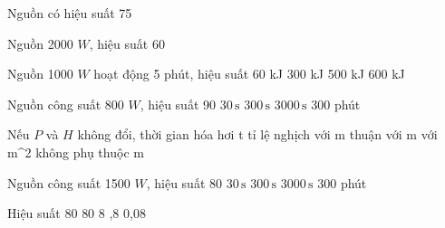 \begin{bt}
Nguồn có hiệu suất 75%
\end{bt}

\begin{ex}
Nguồn 2000 $W$, hiệu suất 60%
\end{ex}

\begin{ex}
Nguồn 1000 $W$ hoạt động 5 phút, hiệu suất 60%
\choice
{ kJ}
{300 kJ}
{500 kJ}
{600 kJ}
\end{ex}

\begin{ex}
Nguồn công suất 800 $W$, hiệu suất 90%
\choice
{$30\,\text{s}$}
{\True $300\,\text{s}$}
{$3000\,\text{s}$}
{300 phút}
\end{ex}

\begin{ex}
Nếu $P$ và $H$ không đổi, thời gian hóa hơi t tỉ lệ
\choice
{nghịch với m}
{\True thuận với m}
{với m^2}
{không phụ thuộc m}
\end{ex}

\begin{ex}
Nguồn công suất 1500 $W$, hiệu suất 80%
\choice
{$30\,\text{s}$}
{\True $300\,\text{s}$}
{$3000\,\text{s}$}
{300 phút}
\end{ex}

\begin{ex}
Hiệu suất 80%
\choice
{80}
{8}
{,8}
{0,08}
\end{ex}
